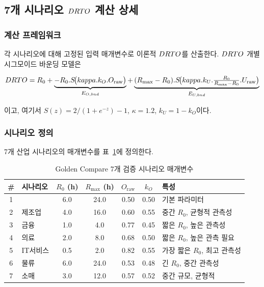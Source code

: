 

\subsection{7개 시나리오 $DRTO$ 계산 상세}
\label{app:golden-scenarios}

\subsubsection{계산 프레임워크}
\label{app:golden-framework}

각 시나리오에 대해 고정된 입력 매개변수로 이론적 $DRTO$를 산출한다.
$DRTO$ 개별 시그모이드 바운딩 모델은 

\begin{equation}
  DRTO = R_0
  + \underbrace{-R_0 . S\!\bigl(kappa . k_O . O_{\text{raw}}\bigr)}_{E_{O,bnd}}
  + \underbrace{(R_{\max} - R_0) . S\!\bigl(kappa . k_U . \tfrac{R_0}{R_{\max}-R_0} . U_{\text{raw}}\bigr)}_{E_{U,bnd}}
  \label{eq:app-golden-model}
\end{equation}

이고, 여기서 $S(z) = 2/(1+e^{-z})-1$, $\kappa = 1.2$, $k_U = 1 - k_O$이다.

\subsubsection{시나리오 정의}
\label{app:golden-scenario-def}

7개 산업 시나리오의 매개변수를 \p{[}표~\ref{tab:app-golden-scenarios}\p{]}에 정의한다.

\begin{table}[htbp]
\centering
\caption{Golden Compare 7개 검증 시나리오 매개변수}
\label{tab:app-golden-scenarios}
\small
\begin{tabular}{clccccl}
\toprule
\textbf{\#} & \textbf{시나리오} & \textbf{$R_0$ (h)} & \textbf{$R_{\max}$ (h)}
  & \textbf{$O_{\text{raw}}$} & \textbf{$k_O$} & \textbf{특성} \\
\midrule
1 & \m{기준선(Baseline)}  & 6.0  & 24.0 & 0.50 & 0.50 & 기본 파라미터 \\
2 & 제조업             & 4.0  & 16.0 & 0.60 & 0.55 & 중간 $R_0$, 균형적 관측성 \\
3 & 금융               & 1.0  & 4.0  & 0.77 & 0.45 & 짧은 $R_0$, 높은 관측성 \\
4 & 의료               & 2.0  & 8.0  & 0.68 & 0.50 & 짧은 $R_0$, 높은 관측 필요 \\
5 & IT서비스            & 0.5  & 2.0  & 0.82 & 0.55 & 가장 짧은 $R_0$, 최고 관측성 \\
6 & 물류               & 6.0  & 24.0 & 0.53 & 0.48 & 긴 $R_0$, 중간 관측성 \\
7 & 소매               & 3.0  & 12.0 & 0.57 & 0.52 & 중간 규모, 균형적 \\
\bottomrule
\end{tabular}
\end{table}

